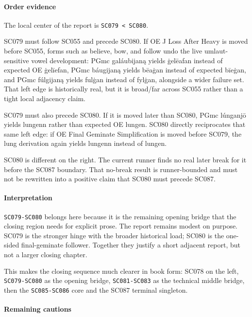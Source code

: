 \documentclass[
  british,
  a4paper,
]{article}
\begin{document}
\paragraph{Order evidence}\label{order-evidence-49}

The local center of the report is \texttt{SC079\ \textless{}\ SC080}.

SC079 must follow SC055 and precede SC080. If OE J Loss After Heavy is
moved before SC055, forms such as believe, bow, and follow undo the live
umlaut-sensitive vowel development: PGmc galáubijaną yields ġelēafan
instead of expected OE ġelīefan, PGmc báugijaną yields bēaġan instead of
expected bīeġan, and PGmc fúlgijaną yields fulġan instead of fylġan,
alongside a wider failure set. That left edge is historically real, but
it is broad/far across SC055 rather than a tight local adjacency claim.

SC079 must also precede SC080. If it is moved later than SC080, PGmc
lúnganjō yields lungenn rather than expected OE lungen. SC080 directly
reciprocates that same left edge: if OE Final Geminate Simplification is
moved before SC079, the lung derivation again yields lungenn instead of
lungen.

SC080 is different on the right. The current runner finds no real later
break for it before the SC087 boundary. That no-break result is
runner-bounded and must not be rewritten into a positive claim that
SC080 must precede SC087.

\paragraph{Interpretation}\label{interpretation-49}

\texttt{SC079-SC080} belongs here because it is the remaining opening
bridge that the closing region needs for explicit prose. The report
remains modest on purpose. SC079 is the stronger hinge with the broader
historical load; SC080 is the one-sided final-geminate follower.
Together they justify a short adjacent report, but not a larger closing
chapter.

This makes the closing sequence much clearer in book form: SC078 on the
left, \texttt{SC079-SC080} as the opening bridge, \texttt{SC081-SC083}
as the technical middle bridge, then the \texttt{SC085-SC086} core and
the SC087 terminal singleton.

\paragraph{Remaining cautions}\label{remaining-cautions-49}
\end{document}
